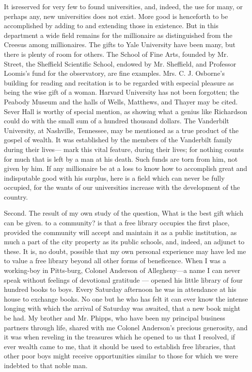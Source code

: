 \documentclass[11pt,openany]{book}
\begin{document}
It isreserved for very few to found universities, and, indeed, the use for many, or perhaps any, new universities does not exist. More good is henceforth to be accomplished by adding to and extending those in existence. But in this department a wide field remains for the millionaire as distinguished from the Creesus among millionaires. The gifts to Yale University have been many, but there is plenty of room for others. The School of Fine Arts, founded by Mr. Street, the Sheffield Scientific School, endowed by Mr. Sheffield, and Professor Loomis's fund for the observatory, are fine examples. Mrs. C. J. Osborne's building for reading and recitation is to be regarded with especial pleasure as being the wise gift of a woman. Harvard University has not been forgotten; the Peabody Museum and the halls of Wells, Matthews, and Thayer may be cited. Sever Hall is worthy of special mention, as showing what a genius like Richardson could do with the small sum of a hundred thousand dollars. The Vanderbilt University, at Nashville, Tennessee, may be mentioned as a true product of the gospel of wealth. It was established by the members of the Vanderbilt family during their lives--- mark this vital feature, during their lives; for nothing counts for much that is left by a man at his death. Such funds are torn from him, not given by him. If any millionaire be at a loss to know how to accomplish great and indisputable good with his surplus, here is a field which can never be fully occupied, for the wants of our universities increase with the development of the country.

Second. The result of my own study of the question, What is the best gift which can be given. to a community? is that a free library occupies the first place, provided the community will accept and maintain it as a public institution, as much a part of the city property as its public schools, and, indeed, an adjunct to these. It is, no doubt, possible that my own personal experience may have led me to value a free library beyond all other forms of beneficence. When I was a working-boy in Pitts-burg, Colonel Anderson of Allegheny---a name I can never speak without feelings of devotional gratitude --- opened his little library of four hundred books to boys. Every Saturday afternoon he was in attendance at his house to exchange books. No one but he who has felt it can ever know the intense longing with which the arrival of Saturday was awaited, that a new book might be had. My brother and Mr. Phipps, who have been my principal business partners through life, shared with me Colonel Anderson's precious generosity, and it was when reveling in the treasures which he opened to us that I resolved, if ever wealth came to me, that it should be used to establish free libraries, that other poor boys might receive opportunities similar to those for which we were indebted to that noble man.
\end{document}
